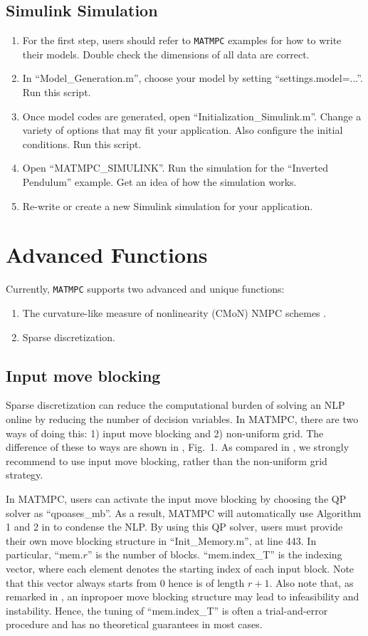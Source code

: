 \documentclass{article}
\newcommand{\software}[1]{{\tt#1}}
\begin{document}
\subsection{Simulink Simulation}
\begin{enumerate}
	\item For the first step, users should refer to \software{MATMPC} examples for how to write their models. Double check the dimensions of all data are correct.
	\item In ``Model\_Generation.m'', choose your model by setting ``settings.model=...''. Run this script.
	\item Once model codes are generated, open ``Initialization\_Simulink.m''. Change a variety of options that may fit your application. Also configure the initial conditions. Run this script.
	\item Open ``MATMPC\_SIMULINK''. Run the simulation for the ``Inverted Pendulum'' example. Get an idea of how the simulation works.
	\item Re-write or create a new Simulink simulation for your application.
\end{enumerate}

\section{Advanced Functions}
Currently, \software{MATMPC} supports two advanced and unique functions:
\begin{enumerate}
	\item The curvature-like measure of nonlinearity (CMoN) NMPC schemes \cite{chen2017fast, chen2018adaptive}.
	\item Sparse discretization. 
\end{enumerate}

\subsection{Input move blocking}
Sparse discretization can reduce the computational burden of solving an NLP online by reducing the number of decision variables. In MATMPC, there are two ways of doing this: 1) input move blocking and 2) non-uniform grid. The difference of these to ways are shown in \cite{chen2019efficient}, Fig.~1. As compared in \cite{chen2019efficient}, we strongly recommend to use input move blocking, rather than the non-uniform grid strategy.

In MATMPC, users can activate the input move blocking by choosing the QP solver as ``qpoases\_mb''. As a result, MATMPC will automatically use Algorithm 1 and 2 in \cite{chen2019efficient} to condense the NLP. By using this QP solver, users must provide their own move blocking structure in ``Init\_Memory.m'', at line 443. In particular, ``mem.$r$'' is the number of blocks. ``mem.index\_T'' is the indexing vector, where each element denotes the starting index of each input block. Note that this vector always starts from $0$ hence is of length $r+1$. Also note that, as remarked in \cite{chen2019efficient}, an inpropoer move blocking structure may lead to infeasibility and instability. Hence, the tuning of ``mem.index\_T'' is often a trial-and-error procedure and has no theoretical guarantees in most cases.



\end{document}
